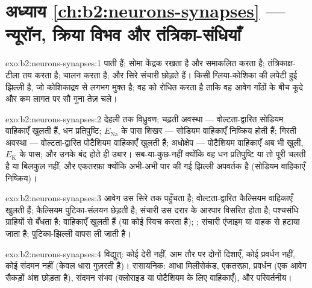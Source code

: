 \section*{अध्याय \ref{ch:b2:neurons-synapses} --- न्यूरॉन, क्रिया विभव और तंत्रिका-संधियाँ}

\begin{solution}{exo:b2:neurons-synapses:1}
  पाती हैं; सोमा केंद्रक रखता है और
समाकलित करता है; तंत्रिकाक्ष-टीला तय करता है;  चालन करता है; और
सिरे संचारी छोड़ते हैं।  किसी ग्लिया-कोशिका की लपेटी हुई झिल्ली है,
जो कोशिकाद्रव से लगभग मुक्त है; वह  को रोधित करता है ताकि
वह आवेग गाँठों के बीच कूदे और कम लागत पर सौ गुना तेज़
चले।
\end{solution}

\begin{solution}{exo:b2:neurons-synapses:2}
देहली तक विध्रुवण; चढ़ती अवस्था --- वोल्टता-द्वारित सोडियम
वाहिकाएँ खुलती हैं, धन प्रतिपुष्टि; $E_{\mathrm{Na}}$ के पास शिखर ---
सोडियम वाहिकाएँ निष्क्रिय होती हैं; गिरती अवस्था --- वोल्टता-द्वारित पोटैशियम
वाहिकाएँ खुलती हैं; अधोक्षेप --- पोटैशियम वाहिकाएँ अब भी खुली,
$E_{\mathrm K}$ के पास; और उनके बंद होते ही उबार। सब-या-कुछ-नहीं क्योंकि वह
धन प्रतिपुष्टि या तो पूरी चलती है या बिलकुल नहीं; और एकतरफ़ा
क्योंकि अभी-अभी पार की गई झिल्ली अपवर्तक है (सोडियम वाहिकाएँ
निष्क्रिय)।
\end{solution}

\begin{solution}{exo:b2:neurons-synapses:3}
आवेग उस सिरे तक पहुँचता है; वोल्टता-द्वारित कैल्सियम वाहिकाएँ खुलती हैं;
कैल्सियम पुटिका-संलयन छेड़ती है; संचारी उस दरार के आरपार
विसरित होता है; पश्चसंधि ग्राहियों से बँधता है; वाहिकाएँ खुलती हैं (या कोई 
स्विच करता है); ; संचारी एंजाइम या
वाहक से हटाया जाता है; पुटिका-झिल्ली वापस ली जाती है।
\end{solution}

\begin{solution}{exo:b2:neurons-synapses:4}
विद्युत्: कोई देरी नहीं, आम तौर पर दोनों दिशाएँ, कोई प्रवर्धन नहीं, कोई
संदमन नहीं (केवल धारा गुज़रती है)। रासायनिक: आधा मिलीसेकंड,
एकतरफ़ा, प्रवर्धन (एक आवेग सैकड़ों अंश छोड़ता है),
संदमन संभव (क्लोराइड या पोटैशियम के लिए वाहिकाएँ), और
परिवर्तनीय।
\end{solution}

